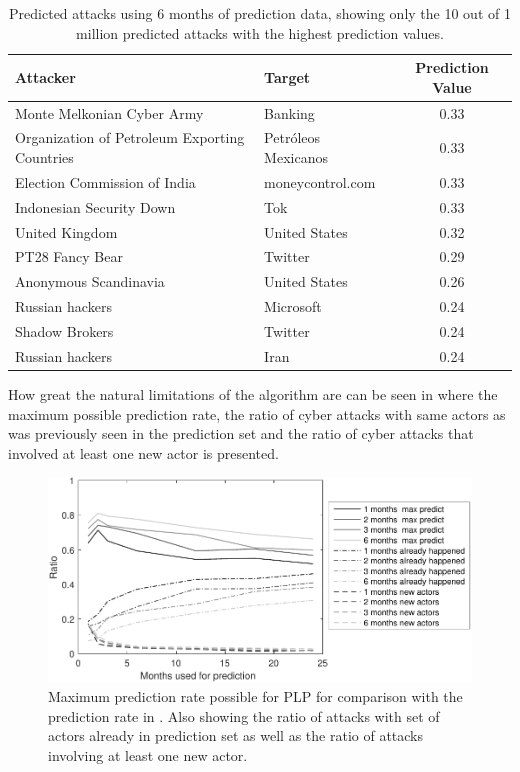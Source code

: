 \begin{table}[]
    \centering
    \begin{tabular}{|l|l|c|}\hline
 Attacker & Target & Prediction Value \\  \hline
 Monte Melkonian Cyber Army & Banking & 0.33 \\
 Organization of Petroleum Exporting Countries & Petróleos Mexicanos & 0.33 \\
 Election Commission of India & moneycontrol.com & 0.33 \\
 Indonesian Security Down & Tok & 0.33 \\
 United Kingdom & United States & 0.32 \\
 PT28 Fancy Bear & Twitter & 0.29 \\
 Anonymous Scandinavia & United States & 0.26 \\
 Russian hackers & Microsoft & 0.24 \\ 
 Shadow Brokers & Twitter & 0.24 \\
 Russian hackers & Iran & 0.24 \\ \hline
    \end{tabular}
    \caption{Predicted attacks using 6 months of prediction data, showing only the 10 out of 1 million predicted attacks with the highest prediction values.}
    \label{tab:example_attacks}
\end{table}

How great the natural limitations of the algorithm are can be seen in  where the maximum possible prediction rate, the ratio of cyber attacks with same actors as was previously seen in the prediction set and the ratio of cyber attacks that involved at least one new actor is presented.

\begin{figure}[!ht]
\centering
\includegraphics[width=\textwidth]{images/max_plp_result.pdf}
\caption{\label{fig:plp_max} 
Maximum prediction rate possible for PLP for comparison with the prediction rate in . Also showing the ratio of attacks with set of actors already in prediction set as well as the ratio of attacks involving at least one new actor.}
\end{figure}




